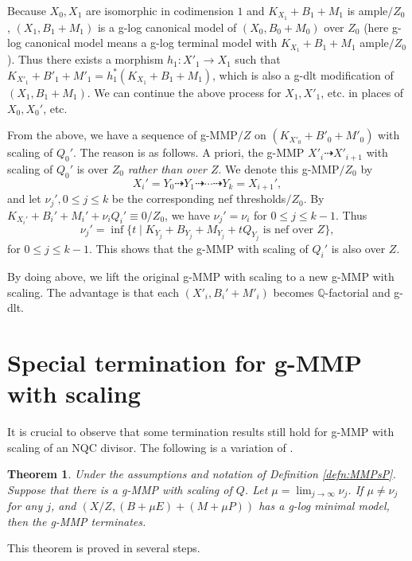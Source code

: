 \documentclass[11pt]{amsart}
\newcommand{\Qq}{\mathbb{Q}}
\newtheorem{theorem}{Theorem}[section]
\begin{document}
Because $X_0, X_1$ are isomorphic in codimension $1$ and $K_{X_1}+B_{1}+M_{1}$ is ample$/Z_0$, $({X_1}, B_{1}+M_{1})$  is a g-log canonical model of $({X_0}, B_0+M_0)$ over $Z_0$ (here g-log canonical model means a g-log terminal model with $K_{X_1}+B_{1}+M_{1}$ ample$/Z_0$). Thus there exists a morphism $h_1: X'_1\to X_1$ such that  $K_{X'_1}+B'_{1}+M'_{1}=h_1^*(K_{X_1}+B_{1}+M_{1})$, which is also a g-dlt modification of $({X_1}, B_{1}+M_{1})$. We can continue the above process for $X_1, X'_1$, etc. in places of $X_0, X_0'$, etc. 

From the above, we have a sequence of g-MMP$/Z$ on $(K_{X'_0}+B'_{0}+M'_{0})$ with scaling of $Q_0'$. The reason is as follows. A priori, the g-MMP $X'_i \dashrightarrow X'_{i+1}$ with scaling of $Q_0'$ is over $Z_0$ \emph{rather than over $Z$}. We denote this g-MMP$/Z_0$ by 
\[
X_i'=Y_0 \dashrightarrow Y_1 \dashrightarrow\cdots \dashrightarrow Y_{k}=X_{i+1}',
\] and let $\nu_j', 0 \leq j \leq k$ be the corresponding nef thresholds$/Z_0$. By $K_{X_i'}+B_i'+M_i'+\nu_iQ_i' \equiv 0/Z_0$, we have $\nu_j'=\nu_i$ for $0 \leq j \leq k-1$. Thus
\[
\nu_j' = \inf\{t \mid K_{Y_j}+B_{Y_j}+M_{Y_j}+tQ_{Y_{j}} \text{~is nef over~} Z\},
\] for $0 \leq j \leq k-1$. This shows that the g-MMP with scaling of $Q_i'$ is also over $Z$.

By doing above, we lift the original g-MMP with scaling to a new g-MMP with scaling. The advantage is that  each $(X'_i, B_i'+M'_i)$ becomes $\Qq$-factorial and g-dlt.

\section{Special termination for g-MMP with scaling}\label{sec: special termination}

It is crucial to observe that some termination results still hold for g-MMP with scaling of an NQC divisor. The following is a variation of \cite[Theorem 1.9]{Birkar12}.
\begin{theorem}\label{thm: gmmtermination}
Under the assumptions and notation of Definition \ref{defn:MMPsP}. Suppose that there is a g-MMP with scaling of $Q$. Let $\mu = \lim_{j \to \infty} \nu_j$. If $\mu\neq \nu_j$ for any $j$, and $(X/Z,(B+\mu E)+(M+\mu P))$ has a g-log minimal model, then the g-MMP terminates. 
\end{theorem}

This theorem is proved in several steps.
\end{document}
